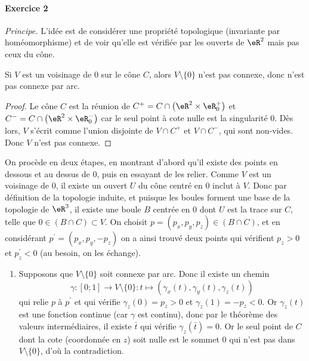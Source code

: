  \paragraph{Exercice 2}
 \emph{Principe.} L'idée est de considérer une propriété topologique
 (invariante par homéomorphisme) et de voir qu'elle est vérifiée par
 les ouverts de $\eR^2$ mais pas ceux du cône.

 \begin{lem}Si $V$ est un voisinage de $0$ sur le cône $C$, alors
   $V\setminus\{0\}$ n'est pas connexe, donc n'est pas connexe par
   arc.\end{lem}
 \begin{proof}Le cône $C$ est la réunion de $C^+ = C \cap
   \left(\eR^2\times \eR_0^+\right)$ et $C^- = C \cap \left(\eR^2\times
     \eR_0^-\right)$ car le seul point à cote nulle est la singularité
   $0$. Dès lors, $V$ s'écrit comme l'union disjointe de $V\cap C^+$
   et $V\cap C^-$, qui sont non-vides. Donc $V$ n'est pas
   connexe.\end{proof}

On procède en deux étapes, en montrant d'abord qu'il
   existe des points en \og dessous\fg{} et au \og dessus\fg{} de
   $0$, puis en essayant de les relier.
     Comme $V$ est un voisinage de $0$, il existe un ouvert $U$ du
     cône centré en $0$ inclut à $V$. Donc par définition de la
     topologie induite, et puisque les boules forment une base de la
     topologie de $\eR^3$, il existe une boule $B$ centrée en $0$ dont
     $U$ est la trace sur $C$, telle que $0 \in (B \cap C) \subset
     V$. On choisit $p = (p_x,p_y,p_z) \in (B \cap C)$, et en
     considérant $p^\prime = (p_x, p_y, -p_z)$ on a ainsi trouvé deux
     points qui vérifient $p_z > 0$ et $p^\prime_z < 0$ (au besoin,
     on les échange).

   \begin{enumerate}
   \item Supposons que $V\setminus\{0\}$ soit connexe par arc. Donc
     il existe un chemin
     \[\gamma : [0;1] \to V\setminus\{0\} : t \mapsto
     (\gamma_x(t),\gamma_y(t),\gamma_z(t))\] qui relie $p$ à
     $p^\prime$ et qui vérifie $\gamma_z(0) = p_z > 0$ et
     $\gamma_z(1) = -p_z < 0$. Or $\gamma_z(t)$ est une fonction
     continue (car $\gamma$ est continu), donc par le théorème des
     valeurs intermédiaires, il existe $\bar t$ qui vérifie
     $\gamma_z(\bar t) = 0$. Or le seul point de $C$ dont la cote
     (coordonnée en $z$) soit nulle est le sommet $0$ qui n'est pas
     dans $V\setminus\{0\}$, d'où la contradiction.
   \end{enumerate}

